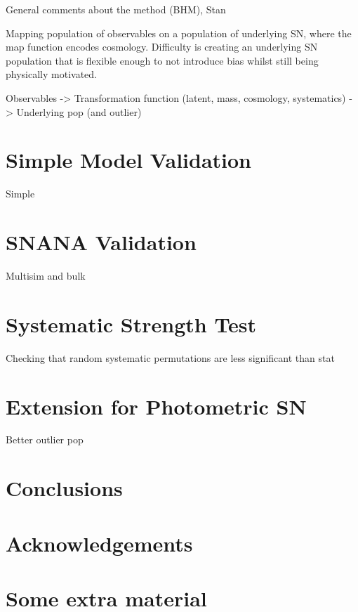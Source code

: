 \documentclass[a4paper,fleqn,usenatbib]{mnras}
\begin{document}
General comments about the method (BHM), Stan

Mapping population of observables on a population of underlying SN, where the map function encodes
cosmology. Difficulty is creating an underlying SN population that is flexible enough to not introduce bias whilst still being physically motivated. 


Observables -> Transformation function (latent, mass, cosmology, systematics) -> Underlying pop (and outlier)

\section{Simple Model Validation}

Simple

\section{SNANA Validation}

Multisim and bulk

\section{Systematic Strength Test}

Checking that random systematic permutations are less significant than stat

\section{Extension for Photometric SN}

Better outlier pop


\section{Conclusions}



\section*{Acknowledgements}














\appendix

\section{Some extra material}







\bsp	%
\label{lastpage}
\end{document}
